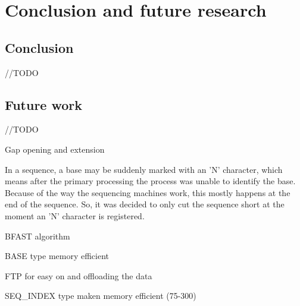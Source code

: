 
\chapter{Conclusion and future research}
\label{ch:Conclusions}

\section{Conclusion}

//TODO

\section{Future work}

//TODO

Gap opening and extension

In a sequence, a base may be suddenly marked with an 'N' character, which means after the primary processing the process was unable to identify the base. Because of the way the sequencing machines work, this mostly happens at the end of the sequence. So, it was decided to only cut the sequence short at the moment an 'N' character is registered.

BFAST algorithm

BASE type memory efficient

FTP for easy on and offloading the data

SEQ\_INDEX type maken memory efficient (75-300)